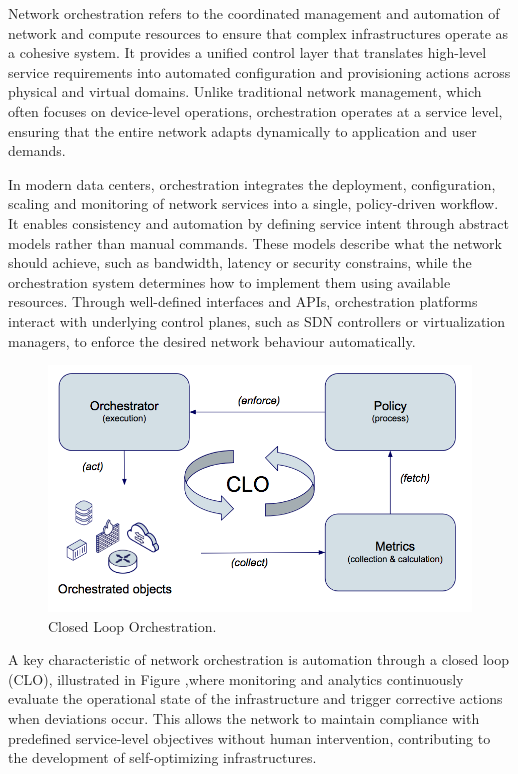 Network orchestration refers to the coordinated management and automation of network and compute resources to ensure that complex infrastructures operate as a cohesive system. It provides a unified control layer that translates high-level service requirements into automated configuration and provisioning actions across physical and virtual domains. Unlike traditional network management, which often focuses on device-level operations, orchestration operates at a service level, ensuring that the entire network adapts dynamically to application and user demands.

In modern data centers, orchestration integrates the deployment, configuration, scaling and monitoring of network services into a single, policy-driven workflow. It enables consistency and automation by defining service intent through abstract models rather than manual commands. These models describe what the network should achieve, such as bandwidth, latency or security constrains, while the orchestration system determines how to implement them using available resources. Through well-defined interfaces and APIs, orchestration platforms interact with underlying control planes, such as SDN controllers or virtualization managers, to enforce the desired network behaviour automatically.

\begin{figure}
    \centering
    \vspace{-16pt}
    \includegraphics[width=\linewidth]{Figures/orchestration.png}
    \caption{Closed Loop Orchestration. \cite{orchestration}}
    \label{closedLoop}
    \vspace{-10pt}
\end{figure}

A key characteristic of network orchestration is automation through a closed loop (CLO), illustrated in Figure ,where monitoring and analytics continuously evaluate the operational state of the infrastructure and trigger corrective actions when deviations occur. This allows the network to maintain compliance with predefined service-level objectives without human intervention, contributing to the development of self-optimizing infrastructures.

